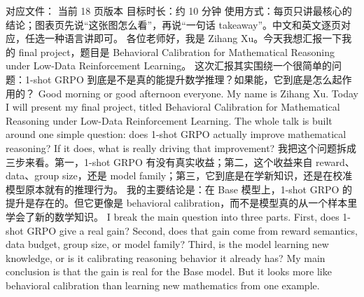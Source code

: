 \markdownRendererDocumentBegin
{}\markdownRendererInterblockSeparator
{}对应文件： 当前 18 页版本\markdownRendererLineBreak
{}目标时长：约 10 分钟\markdownRendererLineBreak
{}使用方式：每页只讲最核心的结论；图表页先说“这张图怎么看”，再说“一句话 takeaway”。中文和英文逐页对应，任选一种语言讲即可。\markdownRendererInterblockSeparator
{}\markdownRendererHorizontalRule{}\markdownRendererInterblockSeparator
{}\markdownRendererInterblockSeparator
{}\markdownRendererInterblockSeparator
{}各位老师好，我是 Zihang Xu。今天我想汇报一下我的 final project，题目是 Behavioral Calibration for Mathematical Reasoning under Low-Data Reinforcement Learning。\markdownRendererInterblockSeparator
{}这次汇报其实围绕一个很简单的问题：1-shot GRPO 到底是不是真的能提升数学推理？如果能，它到底是怎么起作用的？\markdownRendererInterblockSeparator
{}\markdownRendererInterblockSeparator
{}Good morning or good afternoon everyone. My name is Zihang Xu. Today I will present my final project, titled Behavioral Calibration for Mathematical Reasoning under Low-Data Reinforcement Learning.\markdownRendererInterblockSeparator
{}The whole talk is built around one simple question: does 1-shot GRPO actually improve mathematical reasoning? If it does, what is really driving that improvement?\markdownRendererInterblockSeparator
{}\markdownRendererHorizontalRule{}\markdownRendererInterblockSeparator
{}\markdownRendererInterblockSeparator
{}\markdownRendererInterblockSeparator
{}我把这个问题拆成三步来看。第一，1-shot GRPO 有没有真实收益；第二，这个收益来自 reward、data、group size，还是 model family；第三，它到底是在学新知识，还是在校准模型原本就有的推理行为。\markdownRendererInterblockSeparator
{}我的主要结论是：在 Base 模型上，1-shot GRPO 的提升是存在的。但它更像是 behavioral calibration，而不是模型真的从一个样本里学会了新的数学知识。\markdownRendererInterblockSeparator
{}\markdownRendererInterblockSeparator
{}I break the main question into three parts. First, does 1-shot GRPO give a real gain? Second, does that gain come from reward semantics, data budget, group size, or model family? Third, is the model learning new knowledge, or is it calibrating reasoning behavior it already has?\markdownRendererInterblockSeparator
{}My main conclusion is that the gain is real for the Base model. But it looks more like behavioral calibration than learning new mathematics from one example.\markdownRendererInterblockSeparator
